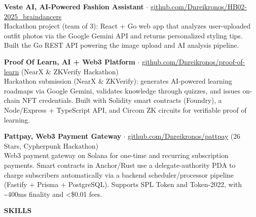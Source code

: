 \documentclass[10pt,a4paper]{article}
\newcommand{\cvsection}[1]{%
    \vspace{8pt}%
    {\large\bfseries\uppercase{#1}}\\[2pt]%
    \vspace{2pt}%
}
\begin{document}
\vspace{4pt}
\noindent\textbf{\footnotesize Veste AI, AI-Powered Fashion Assistant} {\footnotesize $\cdot$ \href{https://github.com/Dnreikronos/HB02-2025_braindancers}{github.com/Dnreikronos/HB02-2025\_braindancers}}\\
{\footnotesize Hackathon project (team of 3): React + Go web app that analyzes user-uploaded outfit photos via the Google Gemini API and returns personalized styling tips. Built the Go REST API powering the image upload and AI analysis pipeline.}

\vspace{4pt}
\noindent\textbf{\footnotesize Proof Of Learn, AI + Web3 Platform} {\footnotesize $\cdot$ \href{https://github.com/Dnreikronos/proof-of-learn}{github.com/Dnreikronos/proof-of-learn} (NearX \& ZKVerify Hackathon)}\\
{\footnotesize Hackathon submission (NearX \& ZKVerify): generates AI-powered learning roadmaps via Google Gemini, validates knowledge through quizzes, and issues on-chain NFT credentials. Built with Solidity smart contracts (Foundry), a Node/Express + TypeScript API, and Circom ZK circuits for verifiable proof of learning.}

\vspace{4pt}
\noindent\textbf{\footnotesize Pattpay, Web3 Payment Gateway} {\footnotesize $\cdot$ \href{https://github.com/Dnreikronos/pattpay}{github.com/Dnreikronos/pattpay} (26 Stars, Cypherpunk Hackathon)}\\
{\footnotesize Web3 payment gateway on Solana for one-time and recurring subscription payments. Smart contracts in Anchor/Rust use a delegate-authority PDA to charge subscribers automatically via a backend scheduler/processor pipeline (Fastify + Prisma + PostgreSQL). Supports SPL Token and Token-2022, with \textasciitilde400ms finality and <\$0.01 fees.}

\cvsection{Skills}
\end{document}
